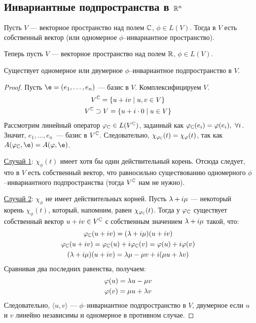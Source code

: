 \subsection*{Инвариантные подпространства в $\mathbb{R}^n$}

Пусть $V$ --- векторное пространство над полем $\mathbb{C}$, $\phi \in L(V)$. Тогда в $V$ есть собственный вектор (или одномерное $\phi$--инвариантное пространство).

\vspace{0.2cm}
Теперь пусть $V$ --- векторное пространство над полем $\mathbb{R}$, $\phi \in L(V)$.

\begin{Theorem}
Существует одномерное или двумерное $\phi$--инвариантное подпространство в $V$.
\end{Theorem}

\begin{proof}
Пусть $\e = (e_1, \ldots, e_n)$ --- базис в $V$. Комплексифицируем $V$.
\begin{gather*}
V^{\mathbb{C}} = \{ u + iv \mid u, v \in V \} \\
V^{\mathbb{C}} \supset V = \{u + i\cdot0 \mid u \in V  \}
\end{gather*}
Рассмотрим линейный оператор $\varphi_{\mathbb{C}} \in L(V^{\mathbb{C}})$, заданный как $\varphi_{\mathbb{C}}(e_i) = \varphi(e_i),\ \forall i$. Значит, $e_1, \ldots, e_n$~--- базис в $V^{\mathbb{C}}$. Следовательно, $\chi_{\varphi_{\mathbb{C}}}(t) = \chi_\varphi(t)$, так как $A(\phi_\C, \e) = A(\phi, \e)$.

\underline{Случай 1}: $\chi_\phi(t)$ имеет хотя бы один действительный корень. Отсюда следует, что в $V$ есть собственный вектор, что равносильно существованию одномерного $\phi$--инвариантного подпространства (тогда $V^{\mathbb{C}}$ нам не нужно).

\underline{Случай 2}: $\chi_\phi$ не имеет действительных корней. Пусть $\lambda + i\mu$ --- некоторый корень $\chi_\phi(t) $, который, напомним, равен $\chi_{\varphi_{\mathbb{C}}}(t)$. Тогда у $\varphi_{\mathbb{C}}$ существует собственный вектор $u+iv \in V^{\mathbb{C}}$  с собственным значением $\lambda + i\mu$ такой, что:
\begin{gather*}
\varphi_{\mathbb{C}}(u+iv) = (\lambda + i\mu)(u+iv)\\
\varphi_{\mathbb{C}}(u + iv) = \varphi_{\mathbb{C}}(u) + i\varphi_{\mathbb{C}}(v) = \varphi(u) + i\varphi(v) \\
(\lambda + i\mu)(u + iv) = \lambda \mu - \mu v + i(\mu u + \lambda v)
\end{gather*}
Сравнивая два последних равенства, получаем:
\begin{gather*}
\varphi(u) =  \lambda u - \mu v \\
\varphi(v) = \mu u + \lambda v
\end{gather*}
Следовательно, $\langle u, v \rangle$ --- $\phi$--инвариантное подпространство в $V$, двумерное если $u$ и $v$ линейно независимы и одномерное в противном случае.
\end{proof}

